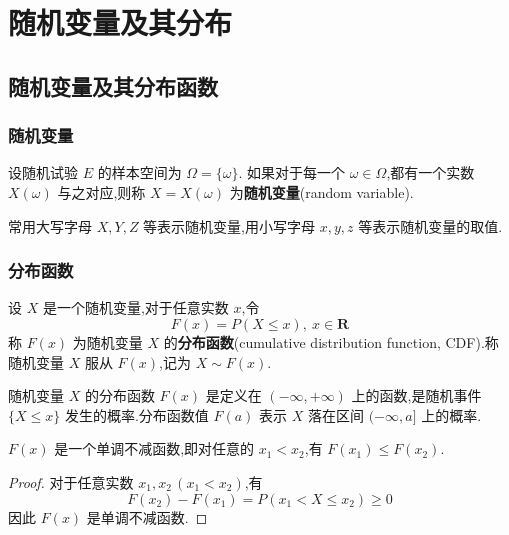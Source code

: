 
\chapter{随机变量及其分布}
\thispagestyle{plain}

\section{随机变量及其分布函数}

\subsection{随机变量}

\begin{definition}
    \indent 设随机试验 $E$ 的样本空间为 $\varOmega=\{\omega\}$. 如果对于每一个 $\omega\in\varOmega$,都有一个实数 $X(\omega)$ 与之对应,则称 $X=X(\omega)$ 为\textbf{随机变量}(random variable).
\end{definition}

常用大写字母 $X,Y,Z$ 等表示随机变量,用小写字母 $x,y,z$ 等表示随机变量的取值.

\subsection{分布函数}

\begin{definition}
    \indent 设 $X$ 是一个随机变量,对于任意实数 $x$,令
    $$
    F(x)=P(X \leqslant x), \ x \in \mathbf{R}
    $$
    称 $F(x)$ 为随机变量 $X$ 的\textbf{分布函数}(cumulative distribution function, CDF).称随机变量 $X$ 服从 $F(x)$,记为 $X \sim F(x)$.
\end{definition}

随机变量 $X$ 的分布函数 $F(x)$ 是定义在 $(-\infty, +\infty)$ 上的函数,是随机事件 $\{X \leqslant x\}$ 发生的概率.分布函数值 $F(a)$ 表示 $X$ 落在区间 $(-\infty,a]$ 上的概率.

\begin{property}[][单调性]
    \indent $F(x)$ 是一个单调不减函数,即对任意的 $x_1 < x_2$,有 $F(x_1) \leqslant F(x_2)$.
\end{property}

\begin{proof}
    对于任意实数 $x_1, x_2\, (x_1 < x_2)$,有
    $$
    F(x_2) - F(x_1) = P(x_1 < X \leqslant x_2) \geqslant 0
    $$
    因此 $F(x)$ 是单调不减函数.
\end{proof}

